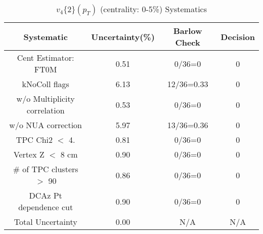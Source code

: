 \begin{table}[htbp]
\caption{$v_4\{2\}(p_{T})$ (centrality: 0-5\%) Systematics}
\label{tab:Sys_pTDiffv4}
\centering
\begin{tabular}{|c|c|c|c|}
\hline
Systematic & Uncertainty(\%) & Barlow Check & Decision \\
\hline
Cent Estimator: FT0M & 0.51 & 0/36=0 & 0 \\
kNoColl flags & 6.13 & 12/36=0.33 & 0 \\
w/o Multiplicity correlation & 0.53 & 0/36=0 & 0 \\
w/o NUA correction & 5.97 & 13/36=0.36 & 0 \\
TPC Chi2 $<$ 4. & 0.81 & 0/36=0 & 0 \\
Vertex Z $<$ 8 cm & 0.90 & 0/36=0 & 0 \\
\# of TPC clusters $>$ 90 & 0.86 & 0/36=0 & 0 \\
DCAz Pt dependence cut & 0.90 & 0/36=0 & 0 \\
\hline
Total Uncertainty & 0.00 & N/A & N/A \\
\hline
\end{tabular}
\end{table}
